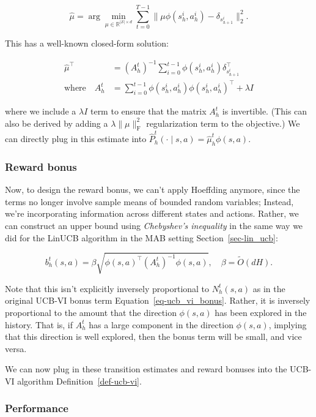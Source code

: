 \documentclass[
  letterpaper,
  DIV=11,
  numbers=noendperiod]{scrreprt}
\theoremstyle{plain}
\theoremstyle{plain}
\theoremstyle{definition}
\theoremstyle{definition}
\theoremstyle{remark}
\begin{document}
\[\widehat \mu = \arg\min_{\mu \in \mathbb{R}^{|\mathcal{S}| \times d}} \sum_{t=0}^{T-1} \|\mu \phi(s_h^i, a_h^i) - \delta_{s_{h+1}^i} \|_2^2.\]

This has a well-known closed-form solution:

\[\begin{aligned}
    \widehat \mu^\top            & = (A_h^t)^{-1} \sum_{i=0}^{t-1} \phi(s_h^i, a_h^i) \delta_{s_{h+1}^i}^\top \\
    \text{where} \quad A_h^t & = \sum_{i=0}^{t-1} \phi(s_h^i, a_h^i) \phi(s_h^i, a_h^i)^\top + \lambda I
\end{aligned}\]

where we include a \(\lambda I\) term to ensure that the matrix
\(A^t_h\) is invertible. (This can also be derived by adding a
\(\lambda \|\mu\|_{\text{F}}^2\) regularization term to the objective.)
We can directly plug in this estimate into
\(\widehat{P}^t_h(\cdot \mid s, a) = \widehat \mu^t_h \phi(s, a)\).

\subsubsection{Reward bonus}\label{reward-bonus-1}

Now, to design the reward bonus, we can't apply Hoeffding anymore, since
the terms no longer involve sample means of bounded random variables;
Instead, we're incorporating information across different states and
actions. Rather, we can construct an upper bound using \emph{Chebyshev's
inequality} in the same way we did for the LinUCB algorithm in the MAB
setting Section~\ref{sec-lin_ucb}:

\[b^t_h(s, a) = \beta \sqrt{\phi(s, a)^\top (A^t_h)^{-1} \phi(s, a)}, \quad \beta = \tilde O(d H).\]

Note that this isn't explicitly inversely proportional to
\(N_h^t(s, a)\) as in the original UCB-VI bonus term
Equation~\ref{eq-ucb_vi_bonus}. Rather, it is inversely proportional to
the amount that the direction \(\phi(s, a)\) has been explored in the
history. That is, if \(A_h^t\) has a large component in the direction
\(\phi(s, a)\), implying that this direction is well explored, then the
bonus term will be small, and vice versa.

We can now plug in these transition estimates and reward bonuses into
the UCB-VI algorithm Definition~\ref{def-ucb-vi}.

\subsubsection{Performance}\label{performance}
\end{document}
